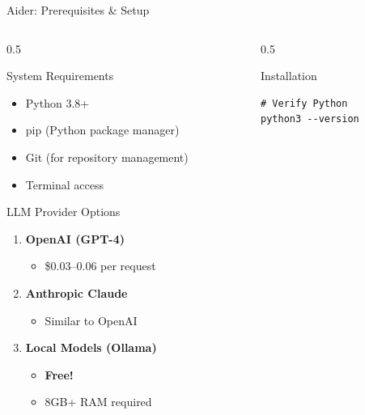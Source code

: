 \documentclass[aspectratio=169,11pt]{beamer}
\begin{document}
\begin{frame}[fragile]{Aider: Prerequisites \& Setup}
    \begin{columns}[T]
        \begin{column}{0.5\textwidth}
            \begin{block}{System Requirements}
                \begin{itemize}
                    \item Python 3.8+
                    \item pip (Python package manager)
                    \item Git (for repository management)
                    \item Terminal access
                \end{itemize}
            \end{block}

            \begin{block}{LLM Provider Options}
                \begin{enumerate}
                    \item \textbf{OpenAI (GPT-4)}
                    \begin{itemize}
                        \item \$0.03--0.06 per request
                    \end{itemize}
                    \item \textbf{Anthropic Claude}
                    \begin{itemize}
                        \item Similar to OpenAI
                    \end{itemize}
                    \item \textbf{Local Models (Ollama)}
                    \begin{itemize}
                        \item \textcolor{Garnet}{\textbf{Free!}}
                        \item 8GB+ RAM required
                    \end{itemize}
                \end{enumerate}
            \end{block}
        \end{column}
        \begin{column}{0.5\textwidth}
            \begin{block}{Installation}
                \begin{lstlisting}[style=bash]
# Verify Python
python3 --version


\end{lstlisting}
\end{block}
\end{column}
\end{columns}
\end{frame}
\end{document}
